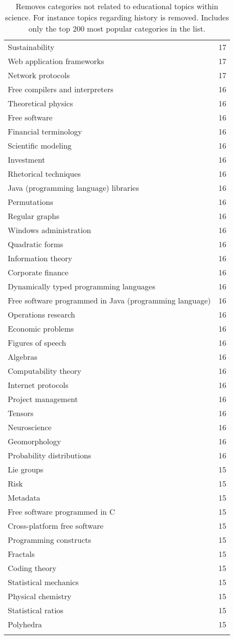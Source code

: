 \begin{appendices}
\begin{longtable} {|| p{20em} | p{5em} ||}
Sustainability	&	17	\\
Web application frameworks	&	17	\\
Network protocols	&	17	\\
Free compilers and interpreters	&	16	\\
Theoretical physics	&	16	\\
Free software	&	16	\\
Financial terminology	&	16	\\
Scientific modeling	&	16	\\
Investment	&	16	\\
Rhetorical techniques	&	16	\\
Java (programming language) libraries	&	16	\\
Permutations	&	16	\\
Regular graphs	&	16	\\
Windows administration	&	16	\\
Quadratic forms	&	16	\\
Information theory	&	16	\\
Corporate finance	&	16	\\
Dynamically typed programming languages	&	16	\\
Free software programmed in Java (programming language)	&	16	\\
Operations research	&	16	\\
Economic problems	&	16	\\
Figures of speech	&	16	\\
Algebras	&	16	\\
Computability theory	&	16	\\
Internet protocols	&	16	\\
Project management	&	16	\\
Tensors	&	16	\\
Neuroscience	&	16	\\
Geomorphology	&	16	\\
Probability distributions	&	16	\\
Lie groups	&	15	\\
Risk	&	15	\\
Metadata	&	15	\\
Free software programmed in C	&	15	\\
Cross-platform free software	&	15	\\
Programming constructs	&	15	\\
Fractals	&	15	\\
Coding theory	&	15	\\
Statistical mechanics	&	15	\\
Physical chemistry	&	15	\\
Statistical ratios	&	15	\\
Polyhedra	&	15	\\
 
  \hline
\caption{Removes categories not related to educational topics within science. For instance topics regarding history is removed. Includes only the top 200 most popular categories in the list.}
\label{table:whitelistV2}
\end{longtable}


\end{appendices}
